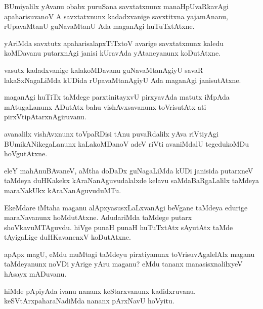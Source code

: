 \documentclass{article}
\begin{document}
\begin{mn}
BUmiyalilx yAvanu obabx puruSana savxtatxnunx manaHpUvaRkavAgi apaharisuvanoV
 A savxtatxnunx kadadxvanige savxtitxna yajamAnanu, rUpavaMtanU guNavaMtanU Ada 
 maganAgi huTuTxtAtxne.
\end{mn}

\begin{mn}
yAriMda savxtutx apaharisalapxTiTxtoV avarige savxtatxnunx kaledu koMDavanu 
putarxnAgi  janisi kUravAda yAtaneyanunx koDutAtxne. 
\end{mn}

\begin{mn}
vasutx kadadxvanige kalakoMDavanu guNavaMtanAgiyU  savaR lakaSxNagaLiMda 
kUDida rUpavaMtanAgiyU Ada maganAgi janisutAtxne.
\end{mn}

\begin{mn}
maganAgi huTiTx taMdege parxtinitayxvU pirxyavAda matutx iMpAda mAtugaLanunx 
ADutAtx bahu vishAvxsavanunx  toVrisutAtx ati pirxVtipAtarxnAgiruvanu.
\end{mn}

\begin{mn}
avanalilx vishAvxnunx toVpaRDisi tAnu puvaRdalilx yAva riVtiyAgi BUmikANikegaLanunx 
kaLakoMDanoV adeV riVti avaniMdalU tegedukoMDu hoVgutAtxne.
\end{mn}

\begin{mn}
eleY mahAnuBAvaneV, aMtha doDaDx guNagaLiMda kUDi janisida putarxneV taMdeya
 duHKakekx kAraNanAguvudalalxde kelavu saMdaBaRgaLalilx taMdeya maraNakUkx  kAraNanAguvuduMTu.
\end{mn}

\begin{mn}
EkeMdare iMtaha maganu  alApxyasusxLaLxvanAgi beVgane taMdeya edurige maraNavanunx hoMdutAtxne. 
AdudariMda taMdege putarx shoVkavuMTAguvdu. hiVge punaH punaH huTuTxtAtx sAyutAtx 
taMde tAyigaLige duHKavanenxV koDutAtxne.
\end{mn}

\begin{mn}
apApx magU, eMdu muMtagi taMdeyu pirxtiyanunx toVrisuvAgalelAlx maganu taMdeyanunx 
noVDi yArige yAru maganu? eMdu tananx manasisxnalilxyeV hAsayx mADuvanu.
\end{mn}

\begin{mn}
hiMde pApiyAda ivanu nananx keStarxvanunx kadidxruvanu. keSVtArxpaharaNadiMda nananx 
pArxNavU hoVyitu.
\end{mn}
\end{document}
